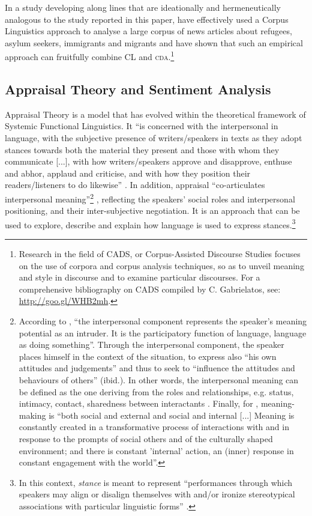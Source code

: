 \documentclass[output=paper]{LSP/langsci}
\begin{document}
In a study developing along lines that are ideationally and hermeneutically analogous to the study reported in this paper, \citet{BakerGabrielatos2008} have effectively used a Corpus Linguistics approach to analyse a large corpus of news articles about refugees, asylum seekers, immigrants and migrants and have shown that such an empirical approach can fruitfully combine CL and \textsc{cda}.\footnote{Research in the field of CADS, or Corpus-Assisted Discourse Studies focuses on the use of corpora and corpus analysis techniques, so as to unveil meaning and style in discourse and to examine particular discourses. For a comprehensive bibliography on CADS compiled by C. Gabrielatos, see: \url{http://goo.gl/WHB2mh}.}

\subsection{Appraisal Theory and Sentiment Analysis} \label{sec:2:2:3}
Appraisal Theory is a model that has evolved within the theoretical framework of Systemic Functional Linguistics. It “is concerned with the interpersonal in language, with the subjective presence of writers/speakers in texts as they adopt stances towards both the material they present and those with whom they communicate [...], with how writers/speakers approve and disapprove, enthuse and abhor, applaud and criticise, and with how they position their readers/listeners to do likewise” \citep[1]{MartinWhite2005}. In addition, appraisal “co-articulates interpersonal meaning”\footnote{According to \citet[112]{Halliday1978}, “the interpersonal component represents the speaker’s meaning potential as an intruder. It is the participatory function of language, language as doing something”. Through the interpersonal component, the speaker places himself in the context of the situation, to express also “his own attitudes and judgements” and thus to seek to “influence the attitudes and behaviours of others” (ibid.). In other words, the interpersonal meaning can be defined as the one deriving from the roles and relationships, e.g. status, intimacy, contact, sharedness between interactants \citep[49]{Eggins1997}. Finally, for \citet[94]{Kress2010}, meaning-making is “both social and external and social and internal [...] Meaning is constantly created in a transformative process of interactions with and in response to the prompts of social others and of the culturally shaped environment; and there is constant 'internal' action, an (inner) response in constant engagement with the world”.} \citep[33]{MartinWhite2005}, reflecting the speakers' social roles and interpersonal positioning, and their inter-subjective negotiation. It is an approach that can be used to explore, describe and explain how language is used to express stances.\footnote{In this context, \textit{stance} is meant to represent “performances through which speakers may align or disalign themselves with and/or ironize stereotypical associations with particular linguistic forms” \citep[4]{Jaffe2009}.}
\end{document}
